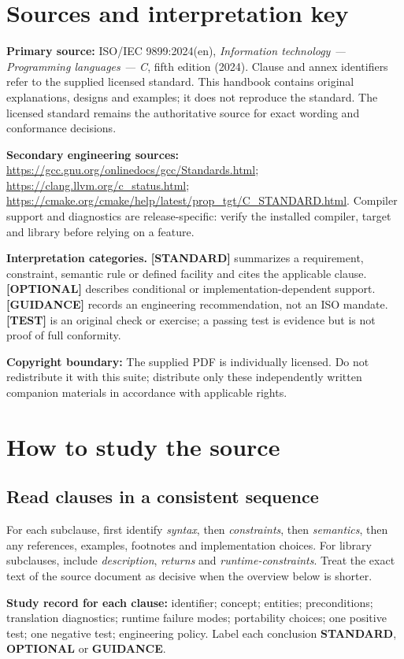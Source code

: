 \documentclass[10pt,letterpaper,oneside]{report}
\begin{document}
\chapter*{Sources and interpretation key}
\textbf{Primary source:} ISO/IEC 9899:2024(en), \emph{Information technology --- Programming languages --- C}, fifth edition (2024). Clause and annex identifiers refer to the supplied licensed standard. This handbook contains original explanations, designs and examples; it does not reproduce the standard. The licensed standard remains the authoritative source for exact wording and conformance decisions.\par
\textbf{Secondary engineering sources:} \url{https://gcc.gnu.org/onlinedocs/gcc/Standards.html}; \url{https://clang.llvm.org/c_status.html}; \url{https://cmake.org/cmake/help/latest/prop_tgt/C_STANDARD.html}. Compiler support and diagnostics are release-specific: verify the installed compiler, target and library before relying on a feature.\par
\begin{keybox}\textbf{Interpretation categories.} \textbf{[STANDARD]} summarizes a requirement, constraint, semantic rule or defined facility and cites the applicable clause. \textbf{[OPTIONAL]} describes conditional or implementation-dependent support. \textbf{[GUIDANCE]} records an engineering recommendation, not an ISO mandate. \textbf{[TEST]} is an original check or exercise; a passing test is evidence but is not proof of full conformity.\end{keybox}
\textbf{Copyright boundary:} The supplied PDF is individually licensed. Do not redistribute it with this suite; distribute only these independently written companion materials in accordance with applicable rights.\par


\chapter{How to study the source}
\section{Read clauses in a consistent sequence}
For each subclause, first identify \emph{syntax}, then \emph{constraints}, then \emph{semantics}, then any references, examples, footnotes and implementation choices. For library subclauses, include \emph{description}, \emph{returns} and \emph{runtime-constraints}. Treat the exact text of the source document as decisive when the overview below is shorter.
\begin{keybox}\textbf{Study record for each clause:} identifier; concept; entities; preconditions; translation diagnostics; runtime failure modes; portability choices; one positive test; one negative test; engineering policy. Label each conclusion \textbf{STANDARD}, \textbf{OPTIONAL} or \textbf{GUIDANCE}.\end{keybox}
\end{document}
